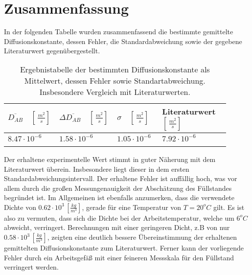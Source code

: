%
%
\section{Zusammenfassung}
In der folgenden Tabelle wurden zusammenfassend die bestimmte gemittelte Diffusionskonstante, dessen Fehler, die Standardabweichung sowie der gegebene Literaturwert gegenübergestellt.
\begin{table}[H]
	\centering
	\label{Ergebnisse}
	\caption{Ergebnistabelle der bestimmten Diffusionskonstante als Mittelwert, dessen Fehler sowie Standartabweichung. Insbesondere Vergleich mit Literaturwerten. \cite{Skript} \\}
	\begin{tabular}{C{0.2\linewidth}|C{0.2\linewidth}|C{0.2\linewidth}|C{0.3\linewidth}}
			\hline \addlinespace[1ex] 
		$\overline{D_{AB}} \quad  \left[ \,\si{\frac{m^2}{s}} \right]$  &  $\Delta \overline{D_{AB}} \quad  \left[ \,\si{\frac{m^2}{s}} \right]$ & $\sigma \quad  \left[ \,\si{\frac{m^2}{s}} \right]$ & Literaturwert $ \left[ \,\si{\frac{m^2}{s}} \right]$\\
		\hline \addlinespace[1ex] 
		$8.47\cdot 10^{-6}$ &$1.58\cdot10^{-6}$& $1.05 \cdot 10^{-6}$& $7.92 \cdot 10^{-6}$ \\
			\hline \addlinespace[1ex] 
	\end{tabular}
\end{table}
Der erhaltene experimentelle Wert stimmt in guter Näherung mit dem Literaturwert überein. Insbesondere liegt dieser in dem ersten Standardabweichungsintervall. Der erhaltene Fehler ist auffällig hoch, was vor allem durch die großen Messungenauigkeit der Abschätzung des Füllstandes begründet ist. Im Allgemeinen ist ebenfalls anzumerken, dass die verwendete Dichte von $ 0.62\cdot 10^3\,\left[ \si{\frac{kg}{m^3}}\right] $, gerade für eine Temperatur von $T=20^oC$ gilt. Es ist also zu vermuten, dass sich die Dichte bei der Arbeitstemperatur, welche um $6^oC$ abweicht, verringert. Berechnungen mit einer geringeren Dicht, z.B von nur $0.58\cdot 10^3\,\left[ \si{\frac{kg}{m^3}}\right] $, zeigten eine deutlich bessere Übereinstimmung der erhaltenen gemittelten Diffusionskonstante zum Literaturwert. Ferner kann der vorliegende Fehler durch ein Arbeitsgefäß mit einer feineren Messskala für den Füllstand verringert werden.
%


